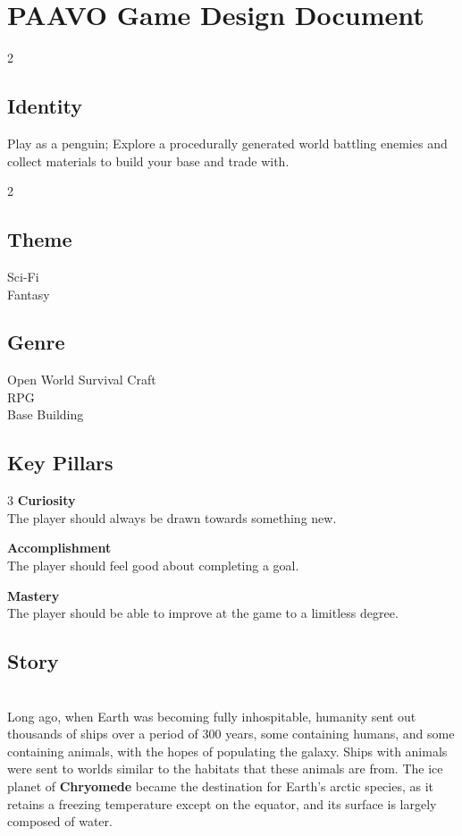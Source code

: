 \documentclass[10pt,a4paper]{article}
\begin{document}
\section{PAAVO Game Design Document}

\begin{multicols*}{2}
  \raggedcolumns

  \subsection{Identity}
  Play as a penguin; Explore a procedurally generated world battling enemies and collect materials to build your base and trade with.

  \begin{multicols}{2}
    \subsection{Theme}
    Sci-Fi \\
    Fantasy \\
    \columnbreak

    \subsection{Genre}
    Open World Survival Craft \\
    RPG \\
    Base Building
  \end{multicols}

  \subsection{Key Pillars}
  \begin{multicols}{3}
    \center
    \textbf{Curiosity} \\
    The player should always be drawn towards something new.

    \columnbreak

    \textbf{Accomplishment} \\
    The player should feel good about completing a goal.

    \columnbreak

    \textbf{Mastery} \\
    The player should be able to improve at the game to a limitless degree.
  \end{multicols}

  \subsection{Story}\\
  Long ago, when Earth was becoming fully inhospitable, humanity sent out thousands of ships over a period of 300 years, some containing humans, and some containing animals, with the hopes of populating the galaxy. Ships with animals were sent to worlds similar to the habitats that these animals are from. The ice planet of \textbf{Chryomede} became the destination for Earth's arctic species, as it retains a freezing temperature except on the equator, and its surface is largely composed of water.
  

\end{multicols*}
\end{document}

